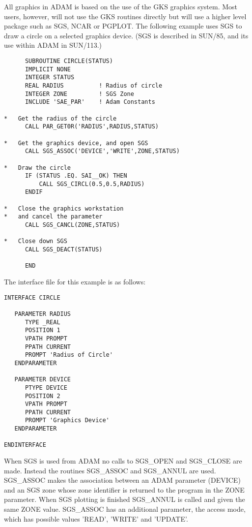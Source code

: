 All graphics in ADAM is based on the use of the GKS graphics system. Most
users, however, will not use the GKS routines directly but will use a
higher level package such as SGS, NCAR or PGPLOT. The following example
uses SGS to draw a circle on a selected graphics device.
(SGS is described in SUN/85, and its use within ADAM in SUN/113.) 
\begin{verbatim}
      SUBROUTINE CIRCLE(STATUS)
      IMPLICIT NONE
      INTEGER STATUS
      REAL RADIUS          ! Radius of circle               
      INTEGER ZONE         ! SGS Zone
      INCLUDE 'SAE_PAR'    ! Adam Constants
                         
*   Get the radius of the circle
      CALL PAR_GET0R('RADIUS',RADIUS,STATUS)

*   Get the graphics device, and open SGS
      CALL SGS_ASSOC('DEVICE','WRITE',ZONE,STATUS)

*   Draw the circle
      IF (STATUS .EQ. SAI__OK) THEN
          CALL SGS_CIRCL(0.5,0.5,RADIUS)
      ENDIF

*   Close the graphics workstation 
*   and cancel the parameter
      CALL SGS_CANCL(ZONE,STATUS)

*   Close down SGS
      CALL SGS_DEACT(STATUS)

      END                  
\end{verbatim}
           
The interface file for this example is as follows:

\begin{verbatim}
INTERFACE CIRCLE

   PARAMETER RADIUS
      TYPE _REAL
      POSITION 1
      VPATH PROMPT
      PPATH CURRENT
      PROMPT 'Radius of Circle'
   ENDPARAMETER

   PARAMETER DEVICE
      PTYPE DEVICE
      POSITION 2
      VPATH PROMPT
      PPATH CURRENT
      PROMPT 'Graphics Device'
   ENDPARAMETER

ENDINTERFACE
\end{verbatim}                

When SGS is used from ADAM no calls to SGS\_OPEN and SGS\_CLOSE are made.
Instead the routines SGS\_ASSOC and SGS\_ANNUL are used. SGS\_ASSOC makes
the association between an ADAM parameter (DEVICE) and an SGS zone whose
zone identifier is returned to the program in the ZONE parameter. When
SGS plotting is finished SGS\_ANNUL is called and given the same ZONE
value. SGS\_ASSOC has an additional parameter, the access mode, which has
possible values 'READ', 'WRITE' and 'UPDATE'.

